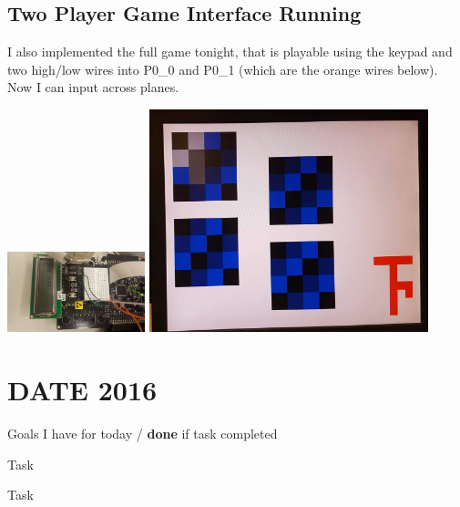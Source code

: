 \documentclass[12pt,twoside]{article}
\newenvironment{tight_itemize}{
\begin{itemize}
  \setlength{\itemsep}{0pt}
  \setlength{\parskip}{0pt}
}{\end{itemize}}
\begin{document}
\subsection{Two Player Game Interface Running}
I also implemented the full game tonight, that is playable using the keypad and two high/low wires into P0\_0 and P0\_1 (which are the orange wires below). Now I can input across planes. 
\begin{center}
\includegraphics[width = 40mm]{Pics/5-4c.jpg}
\includegraphics[width = 81mm]{Pics/5-4a.jpg}
\end{center}


\newpage
\section{DATE 2016}

Goals I have for today / {\bf done} if task completed
\begin{tight_itemize}
\item Task %
\item Task 
\end{tight_itemize}
\end{document}
